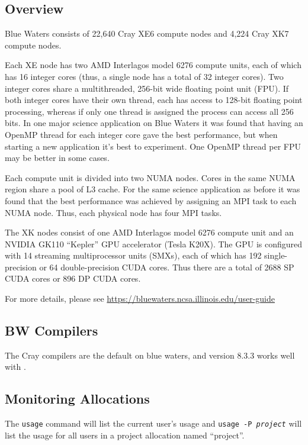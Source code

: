 \subsection{Overview}

Blue Waters consists of 22,640 Cray XE6 compute nodes and 4,224
Cray XK7 compute nodes.

Each XE node has two AMD Interlagos model 6276 compute units, each of
which has 16 integer cores (thus, a single node has a total of 32 integer
cores).  Two integer cores share a multithreaded, 256-bit wide floating 
point unit (FPU).  If both integer cores have their own thread, each has access 
to 128-bit floating point processing, whereas if only one thread is 
assigned the process can access all 256 bits.  In one major science
application on Blue Waters it was found that having an OpenMP thread for
each integer core gave the best performance, but when starting a new
application it's best to experiment.  One OpenMP thread per FPU may
be better in some cases.

Each compute unit is divided into two NUMA nodes.  Cores in
the same NUMA region share a pool of L3 cache.  For the same science
application as before it was found that the best performance was achieved
by assigning an MPI task to each NUMA node.  Thus, each physical node
has four MPI tasks.

The XK nodes consist of one AMD Interlagos model 6276 compute unit
and an NVIDIA GK110 ``Kepler'' GPU accelerator (Tesla K20X).  The
GPU is configured with 14 streaming multiprocessor units (SMXs), each
of which has 192 single-precision or 64 double-precision CUDA cores.  Thus
there are a total of 2688 SP CUDA cores or 896 DP CUDA cores.

For more details, please see 
\url{https://bluewaters.ncsa.illinois.edu/user-guide}

\subsection{BW Compilers}

The Cray compilers are the default on blue waters, and version
8.3.3 works well with \maestro.

\subsection{Monitoring Allocations}

The {\tt usage} command will list the current user's usage and 
{\tt usage -P {\em project}} will
list the usage for all users in a project allocation named ``project''.
